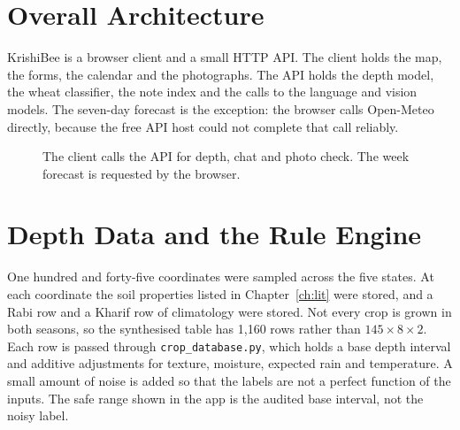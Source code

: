 \label{ch:design}

\section{Overall Architecture}
KrishiBee is a browser client and a small HTTP API. The client holds the map, the forms, the calendar and the photographs. The API holds the depth model, the wheat classifier, the note index and the calls to the language and vision models. The seven-day forecast is the exception: the browser calls Open-Meteo directly, because the free API host could not complete that call reliably.

\begin{figure}[H]
\centering
{}
\caption{The client calls the API for depth, chat and photo check. The week forecast is requested by the browser.}
\label{fig:arch}
\end{figure}

\section{Depth Data and the Rule Engine}
One hundred and forty-five coordinates were sampled across the five states. At each coordinate the soil properties listed in Chapter~\ref{ch:lit} were stored, and a Rabi row and a Kharif row of climatology were stored. Not every crop is grown in both seasons, so the synthesised table has 1{,}160 rows rather than $145 \times 8 \times 2$. Each row is passed through \texttt{crop\_database.py}, which holds a base depth interval and additive adjustments for texture, moisture, expected rain and temperature. A small amount of noise is added so that the labels are not a perfect function of the inputs. The safe range shown in the app is the audited base interval, not the noisy label.

